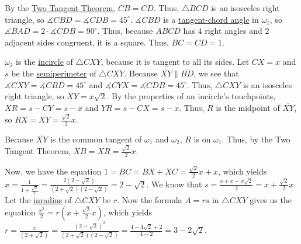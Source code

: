 \begin{enumerate}
 By the \href{https://artofproblemsolving.com/wiki/index.php?title=Two\_Tangent\_Theorem}{Two Tangent Theorem}, $CB=CD$. Thus, $\triangle BCD$ is an isosceles right triangle, so $\measuredangle CBD=\measuredangle CDB=45^{\circ}$. $\measuredangle CBD$ is a \href{https://artofproblemsolving.com/wiki/index.php?title=Tangent-chord\_angle&action=edit&redlink=1}{tangent-chord angle} in $\omega_1$, so $\measuredangle BAD=2\cdot\measuredangle CDB=90^{\circ}$. Thus, because $ABCD$ has $4$ right angles and $2$ adjacent sides congruent, it is a square. Thus, $BC=CD=1$.

 $\omega_2$ is the \href{https://artofproblemsolving.com/wiki/index.php?title=Incircle}{incircle} of $\triangle CXY$, because it is tangent to all its sides. Let $CX=x$ and $s$ be the \href{https://artofproblemsolving.com/wiki/index.php?title=Semiperimeter}{semiperimeter} of $\triangle CXY$. Because $\overline{XY}\parallel\overline{BD}$, we see that $\measuredangle CXY=\measuredangle CBD=45^{\circ}$ and $\measuredangle CYX=\measuredangle CDB=45^{\circ}$. Thus, $\triangle CXY$ is an isosceles right triangle, so $XY=x\sqrt2$. By the properties of an incircle's touchpoints, $XR=s-CY=s-x$ and $YR=s-CX=s-x$. Thus, $R$ is the midpoint of $\overline{XY}$, so $RX=XY=\frac{\sqrt2}2x$.

 Because $\overline{XY}$ is the common tangent of $\omega_1$ and $\omega_2$, $R$ is on $\omega_1$. Thus, by the Two Tangent Theorem, $XB=XR=\frac{\sqrt2}2x$.

 Now, we have the equation $1=BC=BX+XC=\frac{\sqrt2}2x+x$, which yields $x=\frac1{1+\frac{\sqrt2}2}=\frac{2(2-\sqrt2)}{(2+\sqrt2)(2-\sqrt2)}=2-\sqrt2$. We know that $s=\frac{x+x+x\sqrt2}{2}=x+\frac{\sqrt2}2x$. Let the \href{https://artofproblemsolving.com/wiki/index.php?title=Inradius}{inradius} of $\triangle CXY$ be $r$. Now the formula $A=rs$ in $\triangle CXY$ gives us the equation $\frac{x^2}2=r(x+\frac{\sqrt2}2x)$, which yields $r=\frac x{(2+\sqrt2)}=\frac{(2-\sqrt2)^2}{(2+\sqrt2)(2-\sqrt2)}=\frac{4-4\sqrt2+2}{4-2}=3-2\sqrt2$. 


\end{enumerate}
